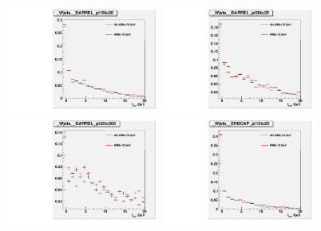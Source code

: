 \begin{figure}[htb]
  \begin{center}
  \includegraphics[width=0.45\textwidth]{../figs/figs_v11/ChannelsMERGED_WGamma/QuickChecks/cTemplatesVsWMt_Wjets_phoPFChIsoCorr_BARREL_pt15to20.pdf} \includegraphics[width=0.45\textwidth]{../figs/figs_v11/ChannelsMERGED_WGamma/QuickChecks/cTemplatesVsWMt_Wjets_phoPFChIsoCorr_BARREL_pt20to35.pdf} \\
  \includegraphics[width=0.45\textwidth]{../figs/figs_v11/ChannelsMERGED_WGamma/QuickChecks/cTemplatesVsWMt_Wjets_phoPFChIsoCorr_BARREL_pt35to500.pdf}  \includegraphics[width=0.45\textwidth]{../figs/figs_v11/ChannelsMERGED_WGamma/QuickChecks/cTemplatesVsWMt_Wjets_phoPFChIsoCorr_ENDCAP_pt15to20.pdf} \\

\end{center}
\end{figure}
